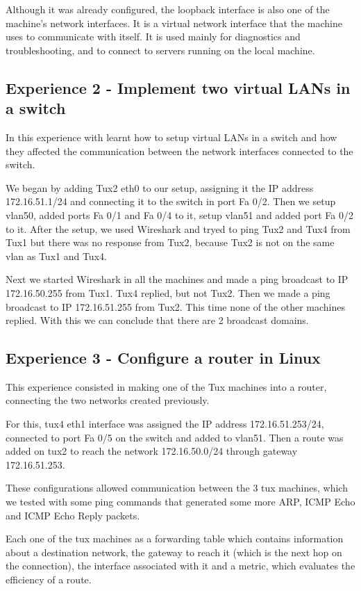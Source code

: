\documentclass[11pt,a4paper,reqno]{article}
\numberwithin{equation}{section}
\begin{document}
Although it was already configured, the loopback interface is also one of the machine’s network interfaces. It is a virtual network interface that the machine uses to communicate with itself. It is used mainly for diagnostics and troubleshooting, and to connect to servers running on the local machine.

\subsection{Experience 2 - Implement two virtual LANs in a switch}

In this experience with learnt how to setup virtual LANs in a switch and how they affected the communication between the network interfaces connected to the switch.

We began by adding Tux2 eth0 to our setup, assigning it the IP address 172.16.51.1/24 and connecting it to the switch in port Fa 0/2. Then we setup vlan50, added ports Fa 0/1 and Fa 0/4 to it, setup vlan51 and added port Fa 0/2 to it.
After the setup, we used Wireshark and tryed to ping Tux2 and Tux4  from Tux1 but there was no response from Tux2, because Tux2 is not on the same vlan as Tux1 and Tux4.

Next we started Wireshark in all the machines and made a ping broadcast to IP 172.16.50.255 from Tux1. Tux4 replied, but not Tux2. Then we made a ping broadcast to IP 172.16.51.255 from Tux2. This time none of the other machines replied. With this we can conclude that there are 2 broadcast domains.

\subsection{Experience 3 - Configure a router in Linux}

This experience consisted in making one of the Tux machines into a router, connecting the two networks created previously.

For this, tux4 eth1 interface was assigned the IP address 172.16.51.253/24, connected to port Fa 0/5 on the switch and added to vlan51. Then a route was added on tux2 to reach the network 172.16.50.0/24 through gateway 172.16.51.253.

These configurations allowed communication between the 3 tux machines, which we tested with some ping commands that generated some more ARP,  ICMP Echo and ICMP Echo Reply packets.

Each one of the tux machines as a forwarding table which contains information about a destination network, the gateway to reach it (which is the next hop on the connection), the interface associated with it and a metric, which evaluates the efficiency of a route.
\end{document}
